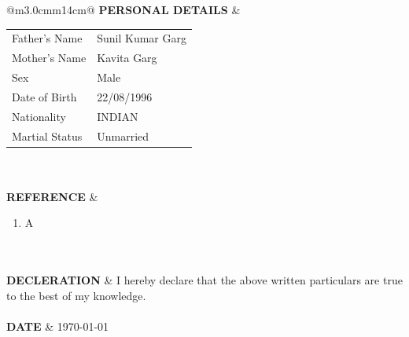 \documentclass[a4paper]{article}
\begin{document}
\begin{longtable}{@{}m{3.0cm}m{14cm}@{}}
			\textrm{\textbf {PERSONAL DETAILS}} & 
				\begin{center}
					\begin{tabular}{ m{4cm}m{4cm}}
						Father's Name & Sunil Kumar Garg \\
						Mother's Name & Kavita Garg \\
						Sex & Male \\
						Date of Birth & 22/08/1996 \\
						Nationality & INDIAN \\
						Martial Status & Unmarried \\
  					\end{tabular}
				\end{center}
			\\ \\
			
			\textrm{\textbf {REFERENCE}} & 
				\begin{enumerate}
					\itemsep -2pt
					\item
					A
				\end{enumerate}
			\\ \\
			
			
			\textrm{\textbf {DECLERATION}} & I hereby declare that the above written particulars are true to the best of my knowledge.
			\\ \\
			
			\textrm{\textbf {DATE}} & \today
			\\ \\
			\end{longtable}
\end{document}
